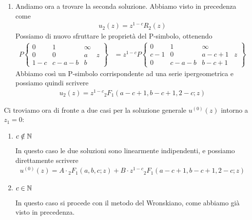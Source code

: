 \begin{enumerate}
	\item Andiamo ora a trovare la seconda soluzione. Abbiamo visto in precedenza come 
	\begin{align}
		u_2(z) = z^{1-c}R_2(z)
	\end{align}
	Possiamo di nuovo sfruttare le proprietà del P-simbolo, ottenendo
	\begin{align}
		P\left\{\begin{matrix}
			0   & 1     & \infty & \\
			0   & 0     & a      & z\\
			1-c & c-a-b & b      & 
		\end{matrix}\right\} &= z^{1-c} P\left\{\begin{matrix}
		0   & 1     & \infty & \\
		c-1 & 0     & a-c+1  & z\\
		0   & c-a-b & b-c+1  & 
	\end{matrix}\right\}
	\end{align}
	Abbiamo così un P-simbolo corrispondente ad una serie ipergeometrica e possiamo quindi scrivere
	\begin{align}
		u_2(z) = z^{1-c} {}_2F_1(a-c+1,b-c+1,2-c; z)
	\end{align}	
\end{enumerate}
Ci troviamo ora di fronte a due casi per la soluzione generale $u^{(0)}(z)$ intorno a $z_1=0$:
\begin{enumerate}
	\item $c\notin \mathbb{N}$
	
	In questo caso le due soluzioni sono linearmente indipendenti, e possiamo direttamente scrivere
	\begin{align}
		u^{(0)}(z) = A\cdot {}_2F_1(a,b,c;z) + B \cdot z^{1-c} {}_2F_1(a-c+1,b-c+1,2-c; z)
	\end{align}
	
	\item $c\in \mathbb{N}$
	
	In questo caso si procede con il metodo del Wronskiano, come abbiamo già visto in precedenza.

\end{enumerate}

